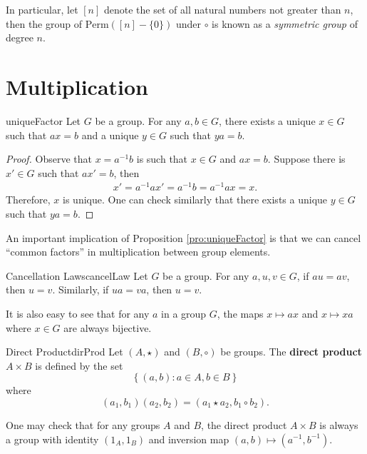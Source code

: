 \documentclass[math, code]{amznotes}
\theoremstyle{remark}
\begin{document}
In particular, let $[n]$ denote the set of all natural numbers not greater than $n$, then the group of $\mathrm{Perm}([n] - \{0\})$ under $\circ$ is known as a \textit{symmetric group} of degree $n$.

\section{Multiplication}
\begin{probox}{}{uniqueFactor}
    Let $G$ be a group. For any $a, b \in G$, there exists a unique $x \in G$ such that $ax = b$ and a unique $y \in G$ such that $ya = b$.
    \tcblower
    \begin{proof}
        Observe that $x = a^{-1}b$ is such that $x \in G$ and $ax = b$. Suppose there is $x' \in G$ such that $ax' = b$, then
        \begin{align*}
            x' = a^{-1}ax' = a^{-1}b = a^{-1}ax = x.
        \end{align*}
        Therefore, $x$ is unique. One can check similarly that there exists a unique $y \in G$ such that $ya = b$.
    \end{proof}
\end{probox}
An important implication of Proposition \ref{pro:uniqueFactor} is that we can cancel ``common factors'' in multiplication between group elements.
\begin{corbox}{Cancellation Laws}{cancelLaw}
    Let $G$ be a group. For any $a, u, v \in G$, if $au = av$, then $u = v$. Similarly, if $ua = va$, then $u = v$.
\end{corbox}
It is also easy to see that for any $a$ in a group $G$, the maps $x \mapsto ax$ and $x \mapsto xa$ where $x \in G$ are always bijective.
\begin{dfnbox}{Direct Product}{dirProd}
    Let $(A, \star)$ and $(B, \circ)$ be groups. The {\color{red} \textbf{direct product}} $A \times B$ is defined by the set
    \begin{equation*}
        \left\{(a, b) \colon a \in A, b \in B\right\}
    \end{equation*}
    where
    \begin{equation*}
        (a_1, b_1)(a_2, b_2) = (a_1 \star a_2, b_1 \circ b_2).
    \end{equation*}
\end{dfnbox}
One may check that for  any groups $A$ and $B$, the direct product $A \times B$ is always a group with identity $(1_A, 1_B)$ and inversion map $(a, b) \mapsto (a^{-1}, b^{-1})$.
\end{document}
